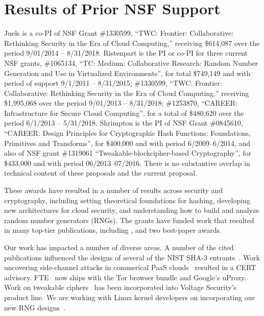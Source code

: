 \section{Results of Prior NSF Support}
\label{sec:prior}

Juels is a co-PI of NSF Grant \#1330599, ``TWC: Frontier:
Collaborative: Rethinking Security in the Era of Cloud Computing,''
receiving \$614,087 over the period 9/01/2014 -- 8/31/2018. 
Ristenpart is the PI or co-PI for three current NSF grants, \#1065134, ``TC: Medium:
Collaborative Research: Random Number Generation and Use in Virtualized
Environments'', for total \$749,149 and with period of support 9/1/2011 --
8/31/2015; 
\#1330599,
``TWC: Frontier: Collaborative: Rethinking Security in the Era of Cloud
Computing,'' receiving \$1,995,068 over the period 9/01/2013 -- 8/31/2018;
\#1253870, ``CAREER: Infrastructure for Secure Cloud Computing'', for a total of
\$480,620 over the period 6/1/2013 -- 5/31/2018.
Shrimpton is the PI of NSF Grant \#0845610, ``CAREER: Design Principles for
Cryptographic Hash Functions: Foundations, Primitives and Transforms'', 
for \$400,000 and with period 6/2009--6/2014, and also of NSF grant \#1319061 
``Tweakable-blockcipher-based Cryptography'', for \$433,000 and with
period 06/2013--07/2016. There is no substantive overlap in technical
content of these proposals and the current proposal.

 These awards have resulted in a number of results
across security and cryptography, including setting theoretical foundations for
hashing, developing new architectures for cloud security, and understanding how
to build and analyze random number generators (RNGs). The grants have funded work that
resulted in many top-tier publications, including
\cite{ZhangEtAl:2014,DodisRV12,DRSS12:hmac,everspaugh2014not,checkoway2014practical,varadarajan2014scheduler,wang2014whowas,jellinek2014day,DRS09,BCS-journal09,OSS,BRSS10,fischlin2010random,RSS,PRS11,dyer2012peek,clrw,tct,Dyer-2013,luchaup2014libfte,luchaup2014formatted},
and two best-paper awards. 

  Our work has impacted a number of diverse areas.  A
number of the cited publications influenced the designs of several of the NIST
SHA-3 entrants~\cite{DRS09,BCS-journal09,BRSS10,RSS}.  Work uncovering
side-channel attacks in commerical PaaS clouds~\cite{ZhangEtAl:2014} resulted
in a CERT advisory. FTE~\cite{Dyer-2013,luchaup2014libfte,luchaup2014formatted}
now ships with the Tor browser bundle and Google's uProxy. Work on tweakable
ciphers~\cite{tct} has been incorporated into Voltage Security's product line.
We are working with Linux kernel developers on incorporating our new RNG
designs~\cite{everspaugh2014not}.


